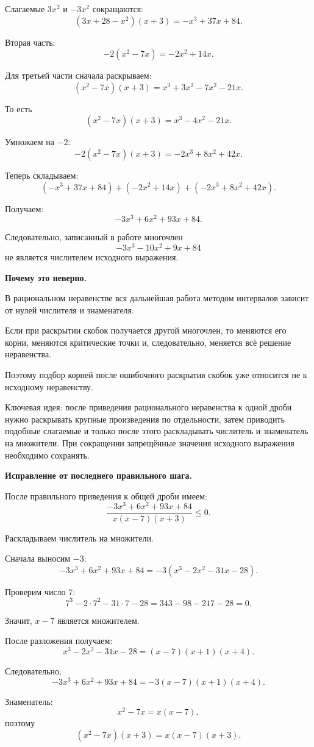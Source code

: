 \documentclass[12pt,a4paper]{article}
\newcommand{\keyidea}[1]{\textcolor{blue!60!black}{Ключевая идея:} #1}
\begin{document}
Слагаемые $3x^2$ и $-3x^2$ сокращаются:
\[
(3x+28-x^2)(x+3)
=
-x^3+37x+84.
\]

Вторая часть:
\[
-2(x^2-7x)
=
-2x^2+14x.
\]

Для третьей части сначала раскрываем:
\[
(x^2-7x)(x+3)
=
x^3+3x^2-7x^2-21x.
\]

То есть
\[
(x^2-7x)(x+3)
=
x^3-4x^2-21x.
\]

Умножаем на $-2$:
\[
-2(x^2-7x)(x+3)
=
-2x^3+8x^2+42x.
\]

Теперь складываем:
\[
(-x^3+37x+84)
+
(-2x^2+14x)
+
(-2x^3+8x^2+42x).
\]

Получаем:
\[
-3x^3+6x^2+93x+84.
\]

Следовательно, записанный в работе многочлен
\[
-3x^3-10x^2+9x+84
\]
не является числителем исходного выражения.

\textbf{Почему это неверно.}

В рациональном неравенстве вся дальнейшая работа методом интервалов
зависит от нулей числителя и знаменателя.

Если при раскрытии скобок получается другой многочлен, то меняются его
корни, меняются критические точки и, следовательно, меняется всё решение
неравенства.

Поэтому подбор корней после ошибочного раскрытия скобок уже относится
не к исходному неравенству.

\keyidea{ после приведения рационального неравенства к одной дроби нужно раскрывать крупные произведения по отдельности, затем приводить подобные слагаемые и только после этого раскладывать числитель и знаменатель на множители. При сокращении запрещённые значения исходного выражения необходимо сохранять.}

\textbf{Исправление от последнего правильного шага.}

После правильного приведения к общей дроби имеем:
\[
\frac{-3x^3+6x^2+93x+84}
{x(x-7)(x+3)}
\le0.
\]

Раскладываем числитель на множители.

Сначала выносим $-3$:
\[
-3x^3+6x^2+93x+84
=
-3(x^3-2x^2-31x-28).
\]

Проверим число $7$:
\[
7^3-2\cdot7^2-31\cdot7-28
=
343-98-217-28
=
0.
\]

Значит, $x-7$ является множителем.

После разложения получаем:
\[
x^3-2x^2-31x-28
=
(x-7)(x+1)(x+4).
\]

Следовательно,
\[
-3x^3+6x^2+93x+84
=
-3(x-7)(x+1)(x+4).
\]

Знаменатель:
\[
x^2-7x=x(x-7),
\]
поэтому
\[
(x^2-7x)(x+3)
=
x(x-7)(x+3).
\]
\end{document}
